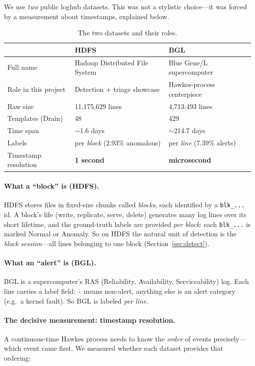 \documentclass[11pt,a4paper]{article}
\newcommand{\code}[1]{\texttt{\small #1}}
\begin{document}
We use \emph{two} public loghub datasets. This was not a stylistic choice---it
was forced by a measurement about timestamps, explained below.

\begin{table}[H]
\centering
\caption{The two datasets and their roles.}
\label{tab:data}
\small
\renewcommand{\arraystretch}{1.15}
\begin{tabular}{@{}l l l@{}}
\toprule
 & \textbf{HDFS} & \textbf{BGL} \\
\midrule
Full name & Hadoop Distributed File System & Blue Gene/L supercomputer \\
Role in this project & Detection + triage showcase & Hawkes-process centerpiece \\
Raw size & 11{,}175{,}629 lines & 4{,}713{,}493 lines \\
Templates (Drain) & 48 & 429 \\
Time span & $\sim$1.6 days & $\sim$214.7 days \\
Labels & per \emph{block} (2.93\% anomalous) & per \emph{line} (7.39\% alerts) \\
Timestamp resolution & \textbf{1 second} & \textbf{microsecond} \\
\bottomrule
\end{tabular}
\end{table}

\paragraph{What a ``block'' is (HDFS).} HDFS stores files in fixed-size chunks
called \emph{blocks}, each identified by a \code{blk\_...} id. A block's life
(write, replicate, serve, delete) generates many log lines over its short
lifetime, and the ground-truth labels are provided \emph{per block}: each
\code{blk\_...} is marked Normal or Anomaly. So on HDFS the natural unit of
detection is the \emph{block session}---all lines belonging to one block
(Section~\ref{sec:detect}).

\paragraph{What an ``alert'' is (BGL).} BGL is a supercomputer's RAS (Reliability,
Availability, Serviceability) log. Each line carries a label field: \code{-} means
non-alert, anything else is an alert category (e.g.\ a kernel fault). So BGL is
labeled \emph{per line}.

\paragraph{The decisive measurement: timestamp resolution.} A continuous-time
Hawkes process needs to know the \emph{order} of events precisely---which event
came first. We measured whether each dataset provides that ordering:
\end{document}
